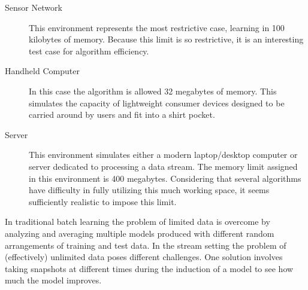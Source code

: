 \documentclass[a4paper,12pt,twoside]{book}
\begin{document}
\begin{description}
\item[Sensor Network] This environment represents the most restrictive case, 
learning in 100 kilobytes of memory. Because this limit is so restrictive,
it is an interesting test case for algorithm efficiency.

\item[Handheld Computer] In this case the algorithm is allowed 32 megabytes of 
memory. This simulates the capacity of lightweight consumer devices designed to
be carried around by users and fit into a shirt pocket.

\item[Server] This environment simulates either a modern laptop/desktop computer
or server dedicated to processing a data stream. The memory limit assigned in 
this environment is 400 megabytes.  Considering that several algorithms have 
difficulty in fully utilizing this much working space, it seems sufficiently 
realistic to impose this limit.

\end{description}
\ENDOMIT
In traditional batch learning the problem of limited data is overcome
by analyzing and averaging multiple models produced with different random
arrangements of training and test data. In the stream setting the problem of
(effectively) unlimited data poses different challenges. One solution involves
taking snapshots at different times during the induction of a model to see how
much the model improves.
\end{document}
